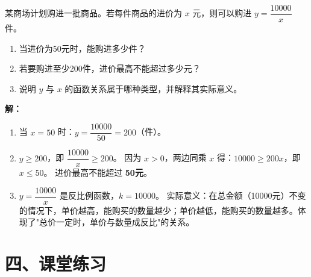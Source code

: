 \documentclass[12pt, a4paper]{ctexart}
\begin{document}
\begin{appbox}[【应用4】经济问题]
某商场计划购进一批商品。若每件商品的进价为 $x$ 元，则可以购进 $y = \dfrac{10000}{x}$ 件。
\begin{enumerate}[label=(\arabic*)]
  \item 当进价为50元时，能购进多少件？
  \item 若要购进至少200件，进价最高不能超过多少元？
  \item 说明 $y$ 与 $x$ 的函数关系属于哪种类型，并解释其实际意义。
\end{enumerate}
\end{appbox}

\textbf{解：}
\begin{enumerate}[label=(\arabic*)]
  \item 当 $x = 50$ 时：$y = \dfrac{10000}{50} = 200$（件）。

  \item $y \geqslant 200$，即 $\dfrac{10000}{x} \geqslant 200$。
  因为 $x > 0$，两边同乘 $x$ 得：$10000 \geqslant 200x$，即 $x \leqslant 50$。
  进价最高不能超过 \textbf{50元}。

  \item $y = \dfrac{10000}{x}$ 是反比例函数，$k = 10000$。
  实际意义：在总金额（10000元）不变的情况下，单价越高，能购买的数量越少；单价越低，能购买的数量越多。体现了"总价一定时，单价与数量成反比"的关系。
\end{enumerate}

\newpage
\section*{\textcolor{tipgreen}{四、课堂练习}}
\end{document}
